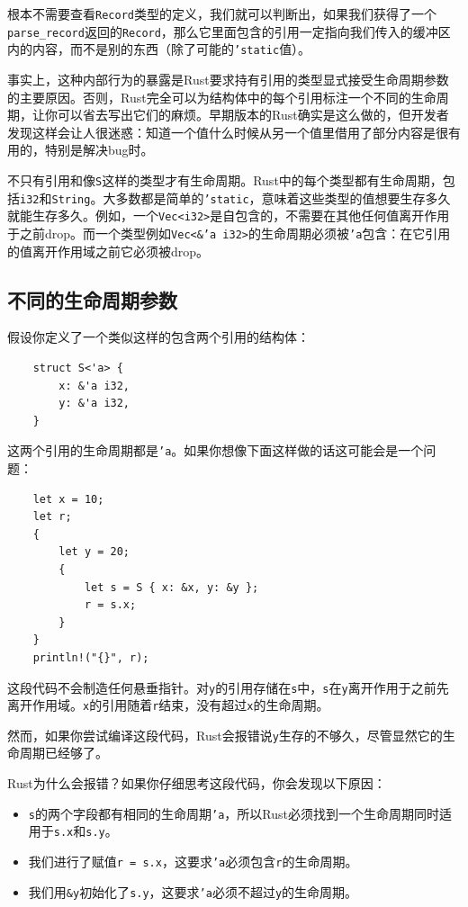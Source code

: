 根本不需要查看\texttt{Record}类型的定义，我们就可以判断出，如果我们获得了一个\texttt{parse\_record}返回的\texttt{Record}，那么它里面包含的引用一定指向我们传入的缓冲区内的内容，而不是别的东西（除了可能的\texttt{'static}值）。

事实上，这种内部行为的暴露是Rust要求持有引用的类型显式接受生命周期参数的主要原因。否则，Rust完全可以为结构体中的每个引用标注一个不同的生命周期，让你可以省去写出它们的麻烦。早期版本的Rust确实是这么做的，但开发者发现这样会让人很迷惑：知道一个值什么时候从另一个值里借用了部分内容是很有用的，特别是解决bug时。

不只有引用和像\texttt{S}这样的类型才有生命周期。Rust中的每个类型都有生命周期，包括\texttt{i32}和\texttt{String}。大多数都是简单的\texttt{'static}，意味着这些类型的值想要生存多久就能生存多久。例如，一个\texttt{Vec<i32>}是自包含的，不需要在其他任何值离开作用于之前drop。而一个类型例如\texttt{Vec<\&'a i32>}的生命周期必须被\texttt{'a}包含：在它引用的值离开作用域之前它必须被drop。

\subsection{不同的生命周期参数}\label{DistLife}
假设你定义了一个类似这样的包含两个引用的结构体：
\begin{verbatim}
    struct S<'a> {
        x: &'a i32,
        y: &'a i32,
    }
\end{verbatim}

这两个引用的生命周期都是\texttt{'a}。如果你想像下面这样做的话这可能会是一个问题：
\begin{verbatim}
    let x = 10;
    let r;
    {
        let y = 20;
        {
            let s = S { x: &x, y: &y };
            r = s.x;
        }
    }
    println!("{}", r);
\end{verbatim}

这段代码不会制造任何悬垂指针。对\texttt{y}的引用存储在\texttt{s}中，\texttt{s}在\texttt{y}离开作用于之前先离开作用域。\texttt{x}的引用随着\texttt{r}结束，没有超过\texttt{x}的生命周期。

然而，如果你尝试编译这段代码，Rust会报错说\texttt{y}生存的不够久，尽管显然它的生命周期已经够了。

Rust为什么会报错？如果你仔细思考这段代码，你会发现以下原因：
\begin{itemize}
    \item \texttt{s}的两个字段都有相同的生命周期\texttt{'a}，所以Rust必须找到一个生命周期同时适用于\texttt{s.x}和\texttt{s.y}。
    \item 我们进行了赋值\texttt{r = s.x}，这要求\texttt{'a}必须包含\texttt{r}的生命周期。
    \item 我们用\texttt{\&y}初始化了\texttt{s.y}，这要求\texttt{'a}必须不超过\texttt{y}的生命周期。
\end{itemize}

